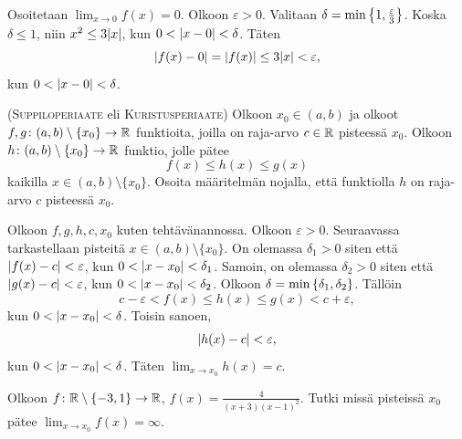 \documentclass[11pt,a4paper]{amsart}
\begin{document}
\begin{solution}
  Osoitetaan \(\lim_{x \to 0} f(x) = 0\). Olkoon \(\varepsilon > 0\). Valitaan
  \(\delta = \min\left\lbrace1, \frac{\varepsilon}{3}\right\rbrace\). Koska \(\delta \leq 1\),
  niin \(x^2 \leq 3\lvert x\rvert\), kun \(0 < \lvert x - 0\rvert < \delta\). Täten
  \[
    \lvert f(x) - 0\rvert = \lvert f(x)\rvert \leq 3\lvert x\rvert < \varepsilon,
  \]
  kun \(0 < \lvert x - 0\rvert < \delta\).
\end{solution}

\begin{exercise}
  (\textsc{Suppiloperiaate} eli \textsc{Kuristusperiaate})
  Olkoon \(x_0 \in (a,b)\) ja olkoot
  \(f,g\colon (a,b) \setminus \{x_0\} \to \mathbb{R}\) funktioita, joilla on
  raja-arvo \(c \in \mathbb{R}\) pisteessä \(x_0\). Olkoon
  \(h\colon (a,b) \setminus \{x_0\} \to \mathbb{R}\) funktio, jolle pätee
  \[
    f(x) \leq h(x) \leq g(x)
  \]
  kaikilla \(x \in (a,b) \setminus \{x_0\}\). Osoita määritelmän nojalla,
  että funktiolla \(h\) on raja-arvo \(c\) pisteessä \(x_0\).
\end{exercise}

\begin{solution}
  Olkoon \(f,g,h,c,x_0\) kuten tehtävänannossa. Olkoon \(\varepsilon > 0\).
  Seuraavassa tarkastellaan pisteitä \(x \in (a,b) \setminus \{x_0\}\).
  On olemassa \(\delta_1 > 0\) siten että \(\lvert f(x) - c\rvert < \varepsilon\),
  kun \(0 < \lvert x - x_0\rvert < \delta_1\). Samoin, on olemassa \(\delta_2 > 0\)
  siten että \(\lvert g(x) - c\rvert < \varepsilon\), kun \(0 < \lvert x -
  x_0\rvert < \delta_2\). Olkoon \(\delta = \min\left\lbrace\delta_1, \delta_2\right\rbrace\). Tällöin
  \[
    c - \varepsilon < f(x) \leq h(x) \leq g(x) < c + \varepsilon,
  \]
  kun \(0 < \lvert x - x_0\rvert < \delta\). Toisin sanoen,
  \[
    \lvert h(x) - c\rvert < \varepsilon,
  \]
  kun \(0 < \lvert x - x_0\rvert < \delta\). Täten \(\lim_{x \to x_0} h(x) = c\).
\end{solution}

\begin{exercise}
  Olkoon \(f\colon \mathbb{R} \setminus \{-3,1\} \to \mathbb{R}\),
  \(f(x) = \frac{4}{(x+3)(x-1)^2}\). Tutki missä pisteissä \(x_0\)
  pätee \(\lim_{x \to x_0} f(x) = \infty\).
\end{exercise}
\end{document}
